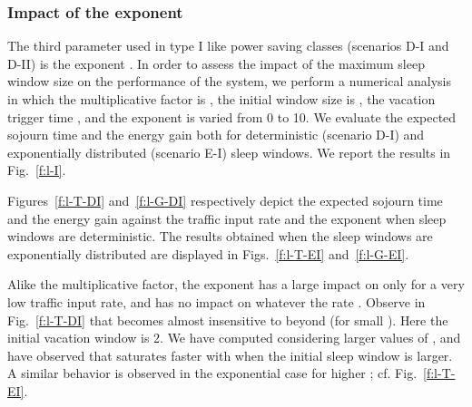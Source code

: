 \documentclass[journal]{IEEEtran}
\begin{document}
\subsubsection{Impact of the exponent } \label{s:l}
The third parameter used in type I like power saving classes
(scenarios D-I and D-II) is the exponent . In order to assess the impact
of the maximum sleep window size on the performance of the system, we
perform a numerical analysis in which the multiplicative factor is
, the initial window size is , the vacation trigger time
, and the exponent  is
varied from 0 to 10. We evaluate the expected sojourn time  and the
energy gain  both for deterministic (scenario D-I) and exponentially
distributed (scenario E-I) sleep windows. We report the results in
Fig.~\ref{f:l-I}.
\begin{figure*}[tb]
\begin{center}
\caption{Impact of  on  and  with either deterministic or exponential .
\label{f:l-I}}
\end{center}
\end{figure*}
Figures~\ref{f:l-T-DI} and~\ref{f:l-G-DI} respectively depict the expected sojourn time  and the energy gain  against the traffic input rate  and the exponent  when sleep windows are
deterministic. The results obtained when the sleep windows are exponentially distributed are displayed in Figs.~\ref{f:l-T-EI} and~\ref{f:l-G-EI}. 

Alike the multiplicative factor, the exponent  has a large impact on  only for a very low traffic input rate, and has no impact on  whatever the rate . Observe in Fig.~\ref{f:l-T-DI} that  becomes almost insensitive to  beyond  (for small ). Here the initial vacation window  is 2. We have computed  considering larger values of , and have observed that  saturates faster with  when the initial sleep window is larger. A similar behavior is observed in the exponential case for higher ; cf. Fig.~\ref{f:l-T-EI}.
\end{document}
